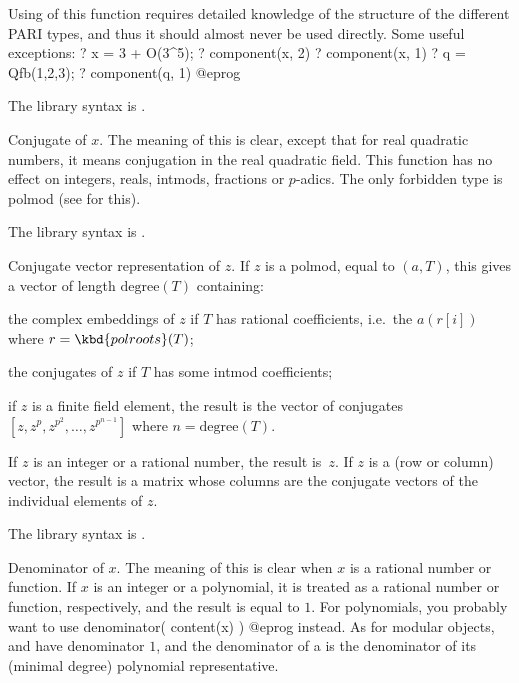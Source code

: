 Using of this function requires detailed knowledge of the structure of the
different PARI types, and thus it should almost never be used directly.
Some useful exceptions:
\bprog
    ? x = 3 + O(3^5);
    ? component(x, 2)
    ? component(x, 1)
    ? q = Qfb(1,2,3);
    ? component(q, 1)
@eprog

The library syntax is .

\label{se:conj}
Conjugate of $x$. The meaning of this
is clear, except that for real quadratic numbers, it means conjugation in the
real quadratic field. This function has no effect on integers, reals,
intmods, fractions or $p$-adics. The only forbidden type is polmod
(see  for this).

The library syntax is .

\label{se:conjvec}
Conjugate vector representation of $z$. If $z$ is a
polmod, equal to $(a,T)$, this gives a vector of length
$\text{degree}(T)$ containing:

\item the complex embeddings of $z$ if $T$ has rational coefficients,
i.e.~the $a(r[i])$ where $r = \kbd{polroots}(T)$;

\item the conjugates of $z$ if $T$ has some intmod coefficients;

\noindent if $z$ is a finite field element, the result is the vector of
conjugates $[z,z^p,z^{p^2},\ldots,z^{p^{n-1}}]$ where $n=\text{degree}(T)$.

\noindent If $z$ is an integer or a rational number, the result is~$z$. If
$z$ is a (row or column) vector, the result is a matrix whose columns are
the conjugate vectors of the individual elements of $z$.

The library syntax is .

\label{se:denominator}
Denominator of $x$. The meaning of this
is clear when $x$ is a rational number or function. If $x$ is an integer
or a polynomial, it is treated as a rational number or function,
respectively, and the result is equal to $1$. For polynomials, you
probably want to use
\bprog
denominator( content(x) )
@eprog\noindent
instead. As for modular objects,  and  have
denominator $1$, and the denominator of a  is the denominator
of its (minimal degree) polynomial representative.


